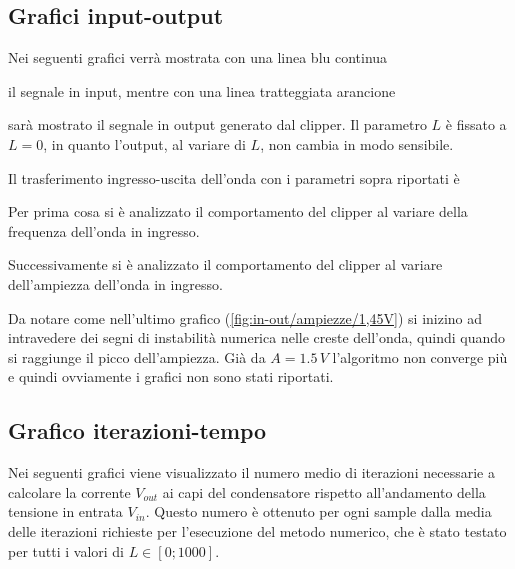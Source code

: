 		\subsection{Grafici input-output}
			Nei seguenti grafici verrà mostrata con una linea blu continua
			il segnale in \textcolor{matlab_blue}{input}, mentre con una linea tratteggiata arancione
			sarà mostrato il segnale in \textcolor{matlab_orange}{output} generato dal clipper. Il parametro $L$ è fissato a $L = 0$, in quanto l'output, al variare di $L$, non cambia in modo sensibile.
		
			Il trasferimento ingresso-uscita dell'onda con i parametri sopra riportati è
			\pagebreak
		
			Per prima cosa si è analizzato il comportamento del clipper al variare della frequenza dell'onda in ingresso.
			\graficospace
			\graficospace
			\pagebreak
		
			Successivamente si è analizzato il comportamento del clipper al variare dell'ampiezza dell'onda in ingresso.
			\graficospace
			\graficospace
			
			Da notare come nell'ultimo grafico (\ref{fig:in-out/ampiezze/1,45V}) si inizino ad intravedere dei segni di instabilità numerica nelle creste dell'onda, quindi quando si raggiunge il picco dell'ampiezza. Già da $A = 1.5\,V$ l'algoritmo non converge più e quindi ovviamente i grafici non sono stati riportati.
			\pagebreak
		
		\subsection{Grafico iterazioni-tempo}
			\label{graphs:iterazioni-tempo}
			Nei seguenti grafici viene visualizzato il numero medio di iterazioni necessarie a calcolare la corrente $V_{out}$ ai capi del condensatore rispetto all'andamento della tensione in entrata $V_{in}$. Questo numero è ottenuto per ogni sample dalla media delle iterazioni richieste per l'esecuzione del metodo numerico, che è stato testato per tutti i valori di $L \in [0; 1000]$. 


